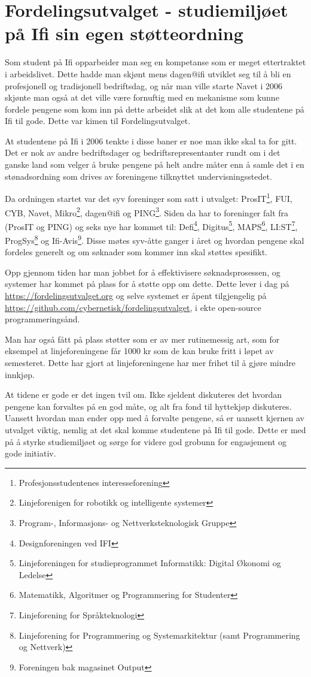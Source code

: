 \chapter[Fordelingsutvalget]{Fordelingsutvalget - studiemiljøet på Ifi sin egen støtteordning}

\author{Skrevet av Arne Hassel og Nikolas Papaioannou}

Som student på Ifi opparbeider man seg en kompetanse som er meget ettertraktet i arbeidslivet. Dette hadde man skjønt mens dagen@ifi utviklet seg til å bli en profesjonell og tradisjonell bedriftsdag, og når man ville starte Navet i 2006 skjønte man også at det ville være fornuftig med en mekanisme som kunne fordele pengene som kom inn på dette arbeidet slik at det kom alle studentene på Ifi til gode. Dette var kimen til Fordelingsutvalget.

At studentene på Ifi i 2006 tenkte i disse baner er noe man ikke skal ta for gitt. Det er nok av andre bedriftsdager og bedriftsrepresentanter rundt om i det ganske land som velger å bruke pengene på helt andre måter enn å samle det i en stønadsordning som drives av foreningene tilknyttet undervisningsstedet.

Da ordningen startet var det syv foreninger som satt i utvalget: ProsIT\footnote{Profesjonsstudentenes interesseforening}, FUI, CYB, Navet, Mikro\footnote{Linjeforenigen for robotikk og intelligente systemer}, dagen@ifi og PING\footnote{Program-, Informasjons- og Nettverksteknologisk Gruppe}. Siden da har to foreninger falt fra (ProsIT og PING) og seks nye har kommet til: Defi\footnote{Designforeningen ved IFI}, Digitus\footnote{Linjeforeningen for studieprogrammet Informatikk: Digital Økonomi og Ledelse}, MAPS\footnote{Matematikk, Algoritmer og Programmering for Studenter}, LI:ST\footnote{Linjeforening for Språkteknologi}, ProgSys\footnote{Linjeforening for Programmering og Systemarkitektur (samt Programmering og Nettverk)} og Ifi-Avis\footnote{Foreningen bak magasinet Output}. Disse møtes syv-åtte ganger i året og hvordan pengene skal fordeles generelt og om søknader som kommer inn skal støttes spesifikt.

Opp gjennom tiden har man jobbet for å effektivisere søknadsprosessen, og systemer har kommet på plass for å støtte opp om dette. Dette lever i dag på \url{https://fordelingsutvalget.org} og selve systemet er åpent tilgjengelig på \url{https://github.com/cybernetisk/fordelingsutvalget}, i ekte open-source programmeringsånd.

Man har også fått på plass støtter som er av mer rutinemessig art, som for eksempel at linjeforeningene får 1000 kr som de kan bruke fritt i løpet av semesteret. Dette har gjort at linjeforeningene har mer frihet til å gjøre mindre innkjøp.

At tidene er gode er det ingen tvil om. Ikke sjeldent diskuteres det hvordan pengene kan forvaltes på en god måte, og alt fra fond til hyttekjøp diskuteres. Uansett hvordan man ender opp med å forvalte pengene, så er uansett kjernen av utvalget viktig, nemlig at det skal komme studentene på Ifi til gode. Dette er med på å styrke studiemiljøet og sørge for videre god grobunn for engasjement og gode initiativ.
